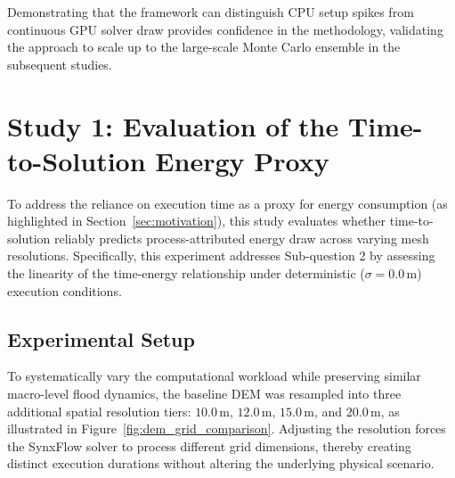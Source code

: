 Demonstrating that the framework can distinguish CPU setup spikes from continuous GPU solver draw provides confidence in the methodology, validating the approach to scale up to the large-scale Monte Carlo ensemble in the subsequent studies.


\section{Study 1: Evaluation of the Time-to-Solution Energy Proxy}
\label{sec:res-study1}

To address the reliance on execution time as a proxy for energy consumption (as highlighted in Section~\ref{sec:motivation}), this study evaluates whether time-to-solution reliably predicts process-attributed energy draw across varying mesh resolutions. Specifically, this experiment addresses Sub-question 2 by assessing the linearity of the time-energy relationship under deterministic ($\sigma = 0.0\,\text{m}$) execution conditions.

\subsection{Experimental Setup}

To systematically vary the computational workload while preserving similar macro-level flood dynamics, the baseline DEM was resampled into three additional spatial resolution tiers: $10.0\,\text{m}$, $12.0\,\text{m}$, $15.0\,\text{m}$, and $20.0\,\text{m}$, as illustrated in Figure~\ref{fig:dem_grid_comparison}. Adjusting the resolution forces the SynxFlow solver to process different grid dimensions, thereby creating distinct execution durations without altering the underlying physical scenario.

